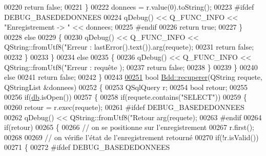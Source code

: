 \begin{DoxyCode}
{{{{{00220                     \textcolor{keywordflow}{return} \textcolor{keyword}{false};
00221                 \}
00222                 donnees = r.value(0).toString();
00223 \textcolor{preprocessor}{                #ifdef DEBUG\_BASEDEDONNEES}
00224                 qDebug() << Q\_FUNC\_INFO << \textcolor{stringliteral}{"Enregistrement -> "} << donnees;
00225 \textcolor{preprocessor}{                #endif}
00226                 \textcolor{keywordflow}{return} \textcolor{keyword}{true};
00227             \}
00228             \textcolor{keywordflow}{else}
00229             \{
00230                 qDebug() << Q\_FUNC\_INFO << QString::fromUtf8(\textcolor{stringliteral}{"Erreur : %
      lastError().text()).arg(requete);
00231                 \textcolor{keywordflow}{return} \textcolor{keyword}{false};
00232             \}
00233         \}
00234         \textcolor{keywordflow}{else}
00235         \{
00236             qDebug() << Q\_FUNC\_INFO << QString::fromUtf8(\textcolor{stringliteral}{"Erreur : requête %
      );
00237             \textcolor{keywordflow}{return} \textcolor{keyword}{false};
00238         \}
00239     \}
00240     \textcolor{keywordflow}{else}
00241         \textcolor{keywordflow}{return} \textcolor{keyword}{false};
00242 \}
00243 
\hyperlink{class_bdd_a397b32b8bc612aadf95bf0595e37ec7c}{00251} \textcolor{keywordtype}{bool} \hyperlink{class_bdd_a8f25d29d309041bbf875700db0efd97b}{Bdd::recuperer}(QString requete, QStringList &donnees)
00252 \{
00253     QSqlQuery r;
00254     \textcolor{keywordtype}{bool} retour;
00255 
00256     \textcolor{keywordflow}{if}(\hyperlink{class_bdd_a8628c1686deda86999f86689c3e7268e}{db}.isOpen())
00257     \{
00258         \textcolor{keywordflow}{if}(requete.contains(\textcolor{stringliteral}{"SELECT"}))
00259         \{
00260             retour = r.exec(requete);
00261 \textcolor{preprocessor}{            #ifdef DEBUG\_BASEDEDONNEES}
00262             qDebug() << QString::fromUtf8(\textcolor{stringliteral}{"Retour %
      arg(requete);
00263 \textcolor{preprocessor}{            #endif}
00264             \textcolor{keywordflow}{if}(retour)
00265             \{
00266                 \textcolor{comment}{// on se positionne sur l'enregistrement}
00267                 r.first();
00268 
00269                 \textcolor{comment}{// on vérifie l'état de l'enregistrement retourné}
00270                 \textcolor{keywordflow}{if}(!r.isValid())
00271                 \{
00272 \textcolor{preprocessor}{                    #ifdef DEBUG\_BASEDEDONNEES}
}}}}}}}}
\end{DoxyCode}

